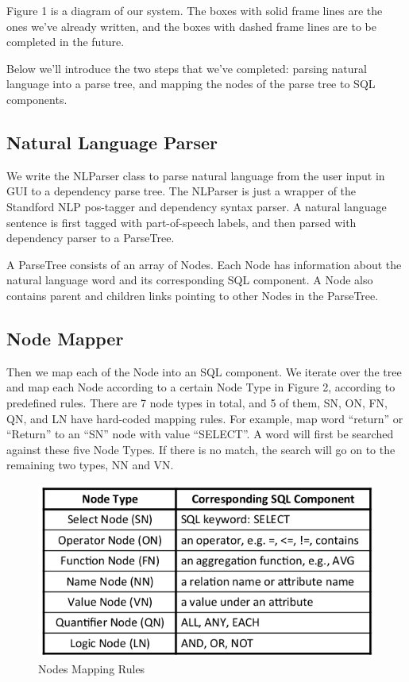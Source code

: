 \documentclass[twocolumn]{article}
\begin{document}
Figure 1 is a diagram of our system. The boxes with solid frame lines are the ones we've already written, and the boxes with dashed frame lines are to be completed in the future.

Below we’ll introduce the two steps that we’ve completed: parsing natural language into a parse tree, and mapping the nodes of the parse tree to SQL components.

\subsection{Natural Language Parser}
We write the NLParser class to parse natural language from the user input in GUI to a dependency parse tree. The NLParser is just a wrapper of the Standford NLP pos-tagger and dependency syntax parser. A natural language sentence is first tagged with part-of-speech labels, and then parsed with dependency parser to a ParseTree.

A ParseTree consists of an array of Nodes. Each Node has information about the natural language word and its corresponding SQL component. A Node also contains parent and children links pointing to other Nodes in the ParseTree.

\subsection{Node Mapper}
Then we map each of the Node into an SQL component. We iterate over the tree and map each Node according to a certain Node Type in Figure 2, according to predefined rules. There are 7 node types in total, and 5 of them, SN, ON, FN, QN, and LN have hard-coded mapping rules. For example, map word “return” or “Return” to an “SN” node with value “SELECT”. A word will first be searched against these five Node Types. If there is no match, the search will go on to the remaining two types, NN and VN.

\begin{figure}[ht]
  \centerline{\includegraphics[width=0.9\linewidth]{figures/nodes_mapping_rules.png}}
  \caption[caption for nodes mapping rules]{Nodes Mapping Rules\protect\footnotemark}
\end{figure}
\end{document}
